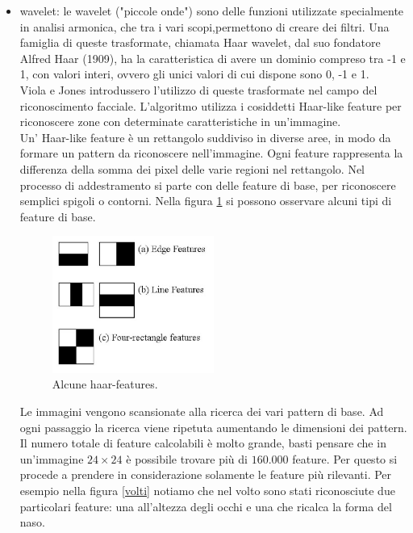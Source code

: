 \begin{itemize}
\item wavelet: le wavelet ("piccole onde") sono delle funzioni utilizzate specialmente in analisi armonica, che tra i vari scopi,permettono di creare dei  filtri. Una famiglia di queste trasformate, chiamata Haar wavelet, dal suo fondatore Alfred  Haar (1909), ha la caratteristica di avere un dominio compreso tra -1 e 1, con valori interi, ovvero gli unici valori di cui dispone sono 0, -1 e 1.\\
Viola e Jones introdussero l'utilizzo di queste trasformate nel campo del riconoscimento facciale. L'algoritmo utilizza i cosiddetti Haar-like feature per riconoscere zone con determinate caratteristiche in un'immagine.\\
Un' Haar-like feature è un rettangolo suddiviso in diverse aree, in modo da formare un pattern da riconoscere nell'immagine. Ogni feature rappresenta la differenza della somma dei pixel delle varie regioni nel rettangolo. Nel processo di addestramento si parte con delle feature di base, per riconoscere semplici spigoli o contorni. Nella figura \ref{features} si possono osservare alcuni tipi di feature di base.\\
\begin{figure}[htbp]
\centering
\includegraphics[width=0.5\textwidth]{images/openCv/haar_features.jpg}
\caption{Alcune haar-features.\label{features}}
\end{figure}

Le immagini vengono scansionate alla ricerca dei vari pattern di base. Ad ogni passaggio la ricerca viene ripetuta aumentando le dimensioni dei pattern. Il numero totale di feature calcolabili è molto grande, basti pensare che in un'immagine $24\times 24$ è possibile trovare più di $160.000$ feature. Per questo si procede a prendere in considerazione solamente le feature più rilevanti.
Per esempio nella figura \ref{volti} notiamo che nel volto sono stati riconosciute due particolari feature: una all'altezza degli occhi e una che ricalca la forma del naso.


\end{itemize}
